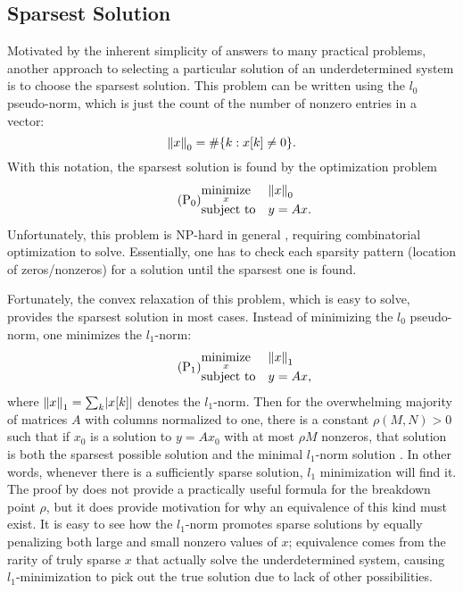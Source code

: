 \subsection{Sparsest Solution}
Motivated by the inherent simplicity of answers to many practical problems, another approach to selecting a particular solution of an underdetermined system is to choose the sparsest solution. This problem can be written using the $l_0$ pseudo-norm, which is just the count of the number of nonzero entries in a vector:
\begin{equation}
 \norm{0}{x} = \#\set{k : x[k] \ne 0}.
\end{equation}
With this notation, the sparsest solution is found by the optimization problem
\begin{equation*}\tag{$\text{P}_\text{0}$}
 \begin{matrix*}[l]
  \underset{x}{\mathrm{minimize}} & \norm{0}{x}\\
  \text{subject to} & y = Ax.
 \end{matrix*}
\end{equation*}
Unfortunately, this problem is NP-hard in general \autocite{Nat95}, requiring combinatorial optimization to solve. Essentially, one has to check each sparsity pattern (location of zeros/nonzeros) for a solution until the sparsest one is found.

Fortunately, the convex relaxation of this problem, which is easy to solve, provides the sparsest solution in most cases. Instead of minimizing the $l_0$ pseudo-norm, one minimizes the $l_1$-norm:
\begin{equation*}\tag{$\text{P}_\text{1}$}\label{eq:l1min}
 \begin{matrix*}[l]
  \underset{x}{\mathrm{minimize}} & \norm{1}{x}\\
  \text{subject to} & y = Ax,
 \end{matrix*}
\end{equation*}
where $\norm{1}{x} = \sum_k \abs{x[k]}$ denotes the $l_1$-norm. Then for the overwhelming majority of matrices $A$ with columns normalized to one, there is a constant $\rho(M, N) > 0$ such that if $x_0$ is a solution to $y=Ax_0$ with at most $\rho M$ nonzeros, that solution is both the sparsest possible solution and the minimal $l_1$-norm solution \autocite{Don06}. In other words, whenever there is a sufficiently sparse solution, $l_1$ minimization will find it. The proof by \textcite{Don06} does not provide a practically useful formula for the breakdown point $\rho$, but it does provide motivation for why an equivalence of this kind must exist. It is easy to see how the $l_1$-norm promotes sparse solutions by equally penalizing both large and small nonzero values of $x$; equivalence comes from the rarity of truly sparse $x$ that actually solve the underdetermined system, causing $l_1$-minimization to pick out the true solution due to lack of other possibilities.

